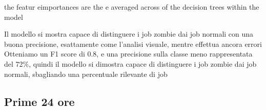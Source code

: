 the featur eimportances are the e averaged across of the decision trees within
the model

Il modello si mostra capace di distinguere i job zombie dai job normali con
una buona precisione, esattamente come l'analisi visuale, mentre effettua
ancora errori
Otteniamo un F1 score di 0.8, e una precisione sulla classe meno rappresentata
del 72\%, quindi il modello si dimostra capace di distinguere i job zombie dai
job normali, sbagliando una percentuale rilevante di job


\subsection{Prime 24 ore}








